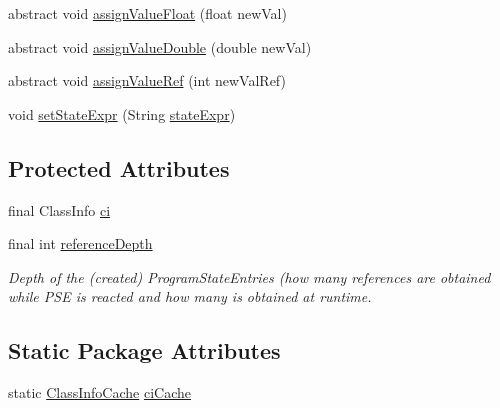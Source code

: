 \begin{DoxyCompactItemize}
\item 
abstract void \hyperlink{classgov_1_1nasa_1_1jpf_1_1inspector_1_1server_1_1programstate_1_1_state_value_a3a836fbd2944a824cea136ead45f15c3}{assign\+Value\+Float} (float new\+Val)
\item 
abstract void \hyperlink{classgov_1_1nasa_1_1jpf_1_1inspector_1_1server_1_1programstate_1_1_state_value_a60fde5277e80549e2b31dd7c925bf677}{assign\+Value\+Double} (double new\+Val)
\item 
abstract void \hyperlink{classgov_1_1nasa_1_1jpf_1_1inspector_1_1server_1_1programstate_1_1_state_value_a8ddefd027953d9cca8406f1d6ebbdc89}{assign\+Value\+Ref} (int new\+Val\+Ref)
\item 
void \hyperlink{classgov_1_1nasa_1_1jpf_1_1inspector_1_1server_1_1programstate_1_1_state_node_a7ed75cc4ba543123c95e506db6f7b84c}{set\+State\+Expr} (String \hyperlink{classgov_1_1nasa_1_1jpf_1_1inspector_1_1server_1_1programstate_1_1_state_node_a784a38d8edeb54f871891cb63de85585}{state\+Expr})
\end{DoxyCompactItemize}
\subsection*{Protected Attributes}
\begin{DoxyCompactItemize}
\item 
final Class\+Info \hyperlink{classgov_1_1nasa_1_1jpf_1_1inspector_1_1server_1_1programstate_1_1_state_value_a0eb4aa1e630ed6372dcfb8c41ae7edc5}{ci}
\item 
final int \hyperlink{classgov_1_1nasa_1_1jpf_1_1inspector_1_1server_1_1programstate_1_1_state_node_a55683618625dae46e8aa68d95811d6bb}{reference\+Depth}
\begin{DoxyCompactList}\small\item\em Depth of the (created) Program\+State\+Entries (how many references are obtained while P\+SE is reacted and how many is obtained at runtime. \end{DoxyCompactList}\end{DoxyCompactItemize}
\subsection*{Static Package Attributes}
\begin{DoxyCompactItemize}
\item 
static \hyperlink{classgov_1_1nasa_1_1jpf_1_1inspector_1_1utils_1_1_class_info_cache}{Class\+Info\+Cache} \hyperlink{classgov_1_1nasa_1_1jpf_1_1inspector_1_1server_1_1programstate_1_1_state_value_a38182b5018580765f3f2cdc9e96e1ca2}{ci\+Cache}
\end{DoxyCompactItemize}


